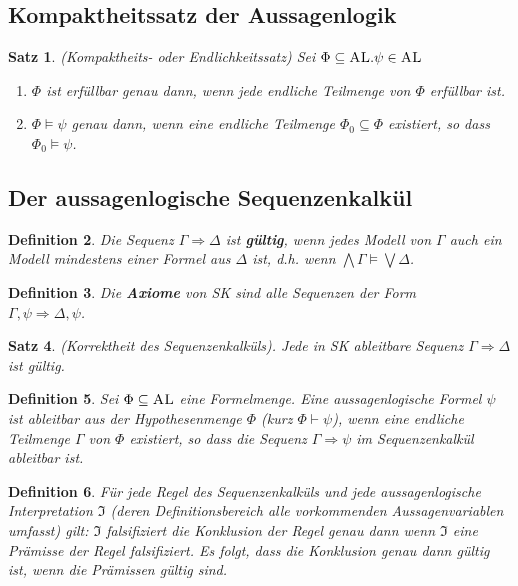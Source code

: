 \documentclass[12pt,a4paper]{article}
\newtheorem{defi}{Definition}[section]
\newtheorem{satz}[defi]{Satz}
\begin{document}
\subsection{Kompaktheitssatz der Aussagenlogik}
	\begin{satz}
		(Kompaktheits- oder Endlichkeitssatz) Sei $\Phi\subseteq \textsc{AL}.\psi\in \textsc{AL}$
		\begin{enumerate}[\text{(i)}]
			\item $\Phi$ ist erfüllbar genau dann, wenn jede endliche Teilmenge von $\Phi$ erfüllbar ist.
			\item $\Phi\models\psi$ genau dann, wenn eine endliche Teilmenge $\Phi_0\subseteq\Phi$ existiert, so dass $\Phi_0\models\psi$.
		\end{enumerate}
	\end{satz}
\subsection{Der aussagenlogische Sequenzenkalkül}
	\begin{defi}
		Die Sequenz $\Gamma\Rightarrow\Delta$ ist \textbf{gültig}, wenn jedes Modell von $\Gamma$ auch ein Modell mindestens einer Formel aus $\Delta$ ist, d.h. wenn $\bigwedge\Gamma\models\bigvee\Delta$.
	\end{defi}
	\begin{defi}
		Die \textbf{Axiome} von \textsc{SK} sind alle Sequenzen der Form\\ $\Gamma,\psi\Rightarrow\Delta,\psi$.
	\end{defi}
	\begin{satz}
		(Korrektheit des Sequenzenkalküls). Jede in \textsc{SK} ableitbare Sequenz $\Gamma\Rightarrow\Delta$ ist gültig.
	\end{satz}
	\begin{defi}
		Sei $\Phi\subseteq\textsc{AL}$ eine Formelmenge. Eine aussagenlogische Formel $\psi$ ist ableitbar aus der Hypothesenmenge $\Phi$ (kurz $\Phi\vdash\psi$), wenn eine endliche Teilmenge $\Gamma$ von $\Phi$ existiert, so dass die Sequenz $\Gamma\Rightarrow\psi$ im Sequenzenkalkül ableitbar ist.
	\end{defi}
	\begin{defi}
		Für  jede Regel des Sequenzenkalküls und jede aussagenlogische Interpretation $\mathfrak{I}$ (deren Definitionsbereich alle vorkommenden
Aussagenvariablen umfasst) gilt: $\mathfrak{I}$ falsifiziert die Konklusion der Regel
genau dann wenn $\mathfrak{I}$	 eine Prämisse der Regel falsifiziert. Es folgt, dass
die Konklusion genau dann gültig ist, wenn die Prämissen gültig sind.
	\end{defi}
\end{document}

